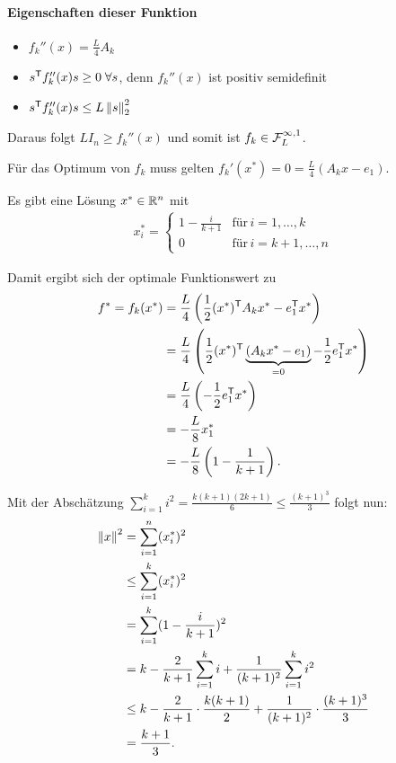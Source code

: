 \paragraph*{Eigenschaften dieser Funktion}
\begin{itemize}
\item $f_k''(x) = \frac{L}{4} A_k$
\item $s^\mathsf{T} f_k''(x)s \geq 0 \; \forall s$, denn $f_k''(x)$ ist positiv semidefinit
\item $s^\mathsf{T} f_k''(x)s \leq L \left\lVert s\right\rVert_2^2$
\end{itemize}

Daraus folgt $LI_n \geq f_k''(x)$ und somit ist $f_k \in \mathcal{F}^{\infty,1}_L$.

Für das Optimum von $f_k$ muss gelten $f_k'(x^*) = 0 = \frac{L}{4}(A_k x - e_1)$.

Es gibt eine Lösung $x^* \in \mathbb R^n$ mit
\begin{align*}
x_i^* = \begin{cases}
1 - \frac{i}{k+1} & \text{für}\, i=1,\dots,k\\
0 & \text{für}\, i=k+1,\dots,n
\end{cases}
\end{align*}

Damit ergibt sich der optimale Funktionswert zu
\begin{align*}
f^* = f_k(x^*)
&= \frac{L}{4} \left( \frac{1}{2} (x^*)^\mathsf{T} A_k x^* - e_1^\mathsf{T} x^* \right)\\
&= \frac{L}{4} \left( \frac{1}{2} (x^*)^\mathsf{T} \underbrace{( A_k x^* - e_1)}_{=0} - \frac{1}{2}e_1^\mathsf{T} x^* \right)\\
&= \frac{L}{4} \left( -\frac{1}{2}e_1^\mathsf{T} x^* \right)\\
&= -\frac{L}{8}x_1^*\\
&= -\frac{L}{8} \left( 1- \frac{1}{k+1} \right).
\end{align*}

Mit der Abschätzung $\displaystyle \sum_{i=1}^{k}i^2 = \frac{k(k+1)(2k+1)}{6} \leq \frac{(k+1)^3}{3}$ folgt nun:
\begin{align*}
\left\lVert x\right\rVert^2 &= \sum_{i=1}^{n} (x_i^*)^2\\
&\leq \sum_{i=1}^{k} (x_i^*)^2\\
&= \sum_{i=1}^{k} (1-\frac{i}{k+1})^2\\
&= k - \frac{2}{k+1} \sum_{i=1}^{k}i + \frac{1}{(k+1)^2} \sum_{i=1}^{k}i^2\\
&\leq k - \frac{2}{k+1} \cdot \frac{k(k+1)}{2} + \frac{1}{(k+1)^2} \cdot \frac{(k+1)^3}{3}\\
&= \frac{k+1}{3}.
\end{align*}

